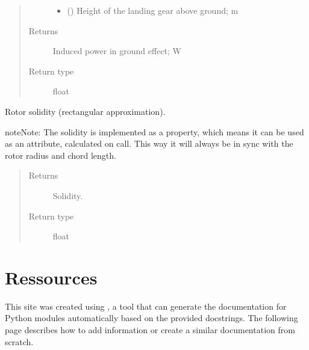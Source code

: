 \documentclass[letterpaper,10pt,english]{sphinxmanual}
\begin{document}
\begin{fulllineitems}
\begin{fulllineitems}
\begin{quote}
\begin{description}
\begin{itemize}
\item {} 
\sphinxAtStartPar
{} () \textendash{} Height of the landing gear above ground; m

\end{itemize}

\item[{Returns}] \leavevmode
\sphinxAtStartPar
Induced power in ground effect; W

\item[{Return type}] \leavevmode
\sphinxAtStartPar
float

\end{description}\end{quote}

\end{fulllineitems}


\begin{fulllineitems}
\label{\detokenize{modules/rotor:rotor.Rotor.solidity}}
\sphinxAtStartPar
Rotor solidity (rectangular approximation).

\begin{sphinxadmonition}{note}{Note:}
\sphinxAtStartPar
The solidity is implemented as a property, which means it can be used
as an attribute, calculated on call. This way it will always be in
sync with the rotor radius and chord length.
\end{sphinxadmonition}
\begin{quote}\begin{description}
\item[{Returns}] \leavevmode
\sphinxAtStartPar
Solidity.

\item[{Return type}] \leavevmode
\sphinxAtStartPar
float

\end{description}\end{quote}

\end{fulllineitems}


\end{fulllineitems}



\chapter{Ressources}
\label{\detokenize{ressources:ressources}}\label{\detokenize{ressources::doc}}
\sphinxAtStartPar
This site was created using , a tool that can generate the documentation for Python modules automatically based on the provided doc\sphinxhyphen{}strings. The following page describes how to add information or create a similar documentation from scratch.
\end{document}
